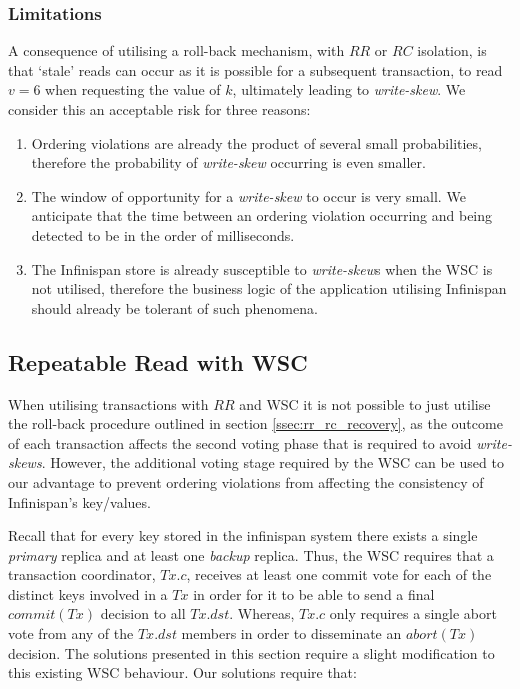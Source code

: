     \subsubsection*{Limitations}
    A consequence of utilising a roll-back mechanism, with $RR$ or $RC$ isolation, is that \textquoteleft{}stale' reads can occur as it is possible for a subsequent transaction, to read $v = 6$ when requesting the value of $k$, ultimately leading to \emph{write-skew}.  We consider this an acceptable risk for three reasons: 
    \begin{enumerate}[label=\roman*]
        \item    Ordering violations are already the product of several small probabilities, therefore the probability of \emph{write-skew} occurring is even smaller.  
        
        \item    The window of opportunity for a \emph{write-skew} to occur is very small.  We anticipate that the time between an ordering violation occurring and being detected to be in the order of milliseconds.   
        
        \item    The Infinispan store is already susceptible to \emph{write-skew}s when the WSC is not utilised, therefore the business logic of the application utilising Infinispan should already be tolerant of such phenomena.  
    \end{enumerate}    
    
    \subsection{Repeatable Read with WSC}
        
        When utilising transactions with $RR$ and WSC it is not possible to just utilise the roll-back procedure outlined in section \ref{ssec:rr_rc_recovery}, as the outcome of each transaction affects the second voting phase that is required to avoid \emph{write-skews}.  However, the additional voting stage required by the WSC can be used to our advantage to prevent ordering violations from affecting the consistency of Infinispan's key/values.  
        
        Recall that for every key stored in the infinispan system there exists a single \emph{primary} replica and at least one \emph{backup} replica.  Thus, the WSC requires that a transaction coordinator, $Tx.c$, receives at least one commit vote for each of the distinct keys involved in a $Tx$ in order for it to be able to send a final $commit(Tx)$ decision to all $Tx.dst$.  Whereas, $Tx.c$ only requires a single abort vote from any of the $Tx.dst$ members in order to disseminate an $abort(Tx)$ decision.  The solutions presented in this section require a slight modification to this existing WSC behaviour.  Our solutions require that: 

